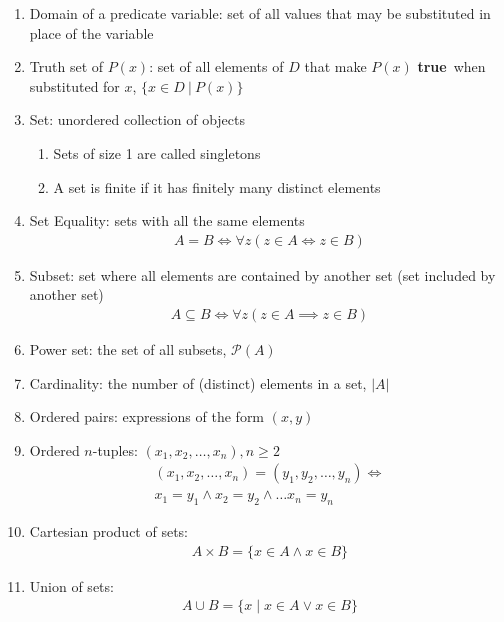 \documentclass[landscape, a4paper]{article}
\newcommand{\Or}{\vee}
\newcommand{\true}{\textbf{true}}
\renewcommand{\P}{\mathcal{P}}
\renewcommand{\and}{\wedge}
\begin{document}
\begin{multicols*}{4}
\begin{enumerate}[wide, labelindent=2pt]
        \item Domain of a predicate variable: set of all values that may be substituted in place of the variable
        \item Truth set of $P(x)$: set of all elements of $D$ that make $P(x)$ \true\ when substituted for $x$, $\{x \in D\ |\ P(x)\}$
        \item Set: unordered collection of objects
              \begin{enumerate}
                  \item Sets of size 1 are called singletons
                  \item A set is finite if it has finitely many distinct elements
              \end{enumerate}
        \item Set Equality: sets with all the same elements
              \begin{align*}
                  A=B \iff \forall z(z\in A\iff z \in B)
              \end{align*}
        \item Subset: set where all elements are contained by another set (set included by another set)
              \begin{align*}
                  A\subseteq B \iff \forall z(z\in A\implies z\in B)
              \end{align*}
        \item Power set: the set of all subsets, $\P(A)$
        \item Cardinality: the number of (distinct) elements in a set, $|A|$
        \item Ordered pairs: expressions of the form $(x,y)$
        \item Ordered $n$-tuples: $(x_1, x_2, \ldots, x_n), n\geq 2$
              \begin{multline*}
                  (x_1,x_2,\ldots, x_n)=(y_1,y_2,\ldots, y_n) \iff \\ x_1=y_1 \and x_2=y_2 \and \ldots x_n=y_n
              \end{multline*}
        \item Cartesian product of sets:
              \begin{align*}
                  A\times B=\{x\in A \and x\in B\}
              \end{align*}
        \item Union of sets:
              \begin{align*}
                  A \cup B=\{x \mid x\in A\Or x\in B\}

\end{align*}
\end{enumerate}
\end{multicols*}
\end{document}
